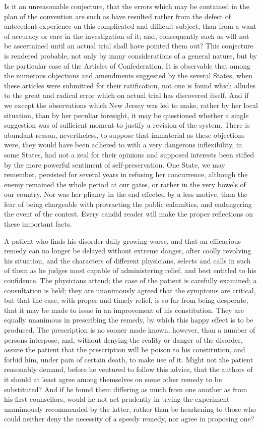 Is it an unreasonable conjecture, that the errors which may be contained in the plan of the convention are such as have resulted rather from the defect of antecedent experience on this complicated and difficult subject, than from a want of accuracy or care in the investigation of it; and, consequently such as will not be ascertained until an actual trial shall have pointed them out? 
This conjecture is rendered probable, not only by many considerations of a general nature, but by the particular case of the Articles of Confederation. 
It is observable that among the numerous objections and amendments suggested by the several States, when these articles were submitted for their ratification, not one is found which alludes to the great and radical error which on actual trial has discovered itself. 
And if we except the observations which New Jersey was led to make, rather by her local situation, than by her peculiar foresight, it may be questioned whether a single suggestion was of sufficient moment to justify a revision of the system. 
There is abundant reason, nevertheless, to suppose that immaterial as these objections were, they would have been adhered to with a very dangerous inflexibility, in some States, had not a zeal for their opinions and supposed interests been stifled by the more powerful sentiment of self-preservation. 
One State, we may remember, persisted for several years in refusing her concurrence, although the enemy remained the whole period at our gates, or rather in the very bowels of our country. 
Nor was her pliancy in the end effected by a less motive, than the fear of being chargeable with protracting the public calamities, and endangering the event of the contest. 
Every candid reader will make the proper reflections on these important facts.

A patient who finds his disorder daily growing worse, and that an efficacious remedy can no longer be delayed without extreme danger, after coolly revolving his situation, and the characters of different physicians, selects and calls in such of them as he judges most capable of administering relief, and best entitled to his confidence. 
The physicians attend; the case of the patient is carefully examined; a consultation is held; they are unanimously agreed that the symptoms are critical, but that the case, with proper and timely relief, is so far from being desperate, that it may be made to issue in an improvement of his constitution. 
They are equally unanimous in prescribing the remedy, by which this happy effect is to be produced. 
The prescription is no sooner made known, however, than a number of persons interpose, and, without denying the reality or danger of the disorder, assure the patient that the prescription will be poison to his constitution, and forbid him, under pain of certain death, to make use of it. 
Might not the patient reasonably demand, before he ventured to follow this advice, that the authors of it should at least agree among themselves on some other remedy to be substituted? 
And if he found them differing as much from one another as from his first counsellors, would he not act prudently in trying the experiment unanimously recommended by the latter, rather than be hearkening to those who could neither deny the necessity of a speedy remedy, nor agree in proposing one?

